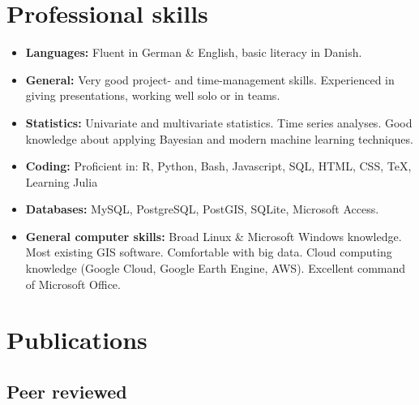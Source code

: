 \documentclass[12pt,a4paper,serif]{moderncv}        %
\makeatletter
\renewcommand*{\bibliographyitemlabel}{\@biblabel{\arabic{enumiv}} }
\renewcommand*{\bibliographyitemlabel}{\textbf{\arabic{enumiv}}}%
\makeatother
\begin{document}

\section{Professional skills}

\vspace{6pt}

\begin{itemize}

\item[] \textbf{Languages:} Fluent in German \& English, basic literacy in Danish.
\item[] \textbf{General:} Very good project- and time-management skills. Experienced in giving presentations, working well solo or in teams.
\item[] \textbf{Statistics:} Univariate and multivariate statistics. Time series analyses. Good knowledge about applying Bayesian and modern machine learning techniques. 
\item[] \textbf{Coding:} Proficient in: R, Python, Bash, Javascript, SQL, HTML, CSS, TeX, Learning Julia
\item[] \textbf{Databases:} MySQL, PostgreSQL, PostGIS, SQLite, Microsoft Access.
\item[] \textbf{General computer skills:} Broad Linux \& Microsoft Windows knowledge. Most existing GIS software. Comfortable with big data. Cloud computing knowledge (Google Cloud, Google Earth Engine, AWS). Excellent command of Microsoft Office.

\end{itemize}


%
\section{Publications}

\subsection{Peer reviewed}
\end{document}
